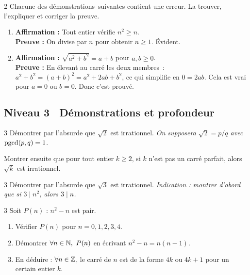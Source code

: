 \begin{exo}{2}
Chacune des \og d\'emonstrations\fg\ suivantes contient une erreur.
La trouver, l'expliquer et corriger la preuve.
\begin{enumerate}
  \item \textbf{Affirmation :} Tout entier v\'erifie $n^2 \geq n$.\\
        \textbf{Preuve :} On divise par $n$ pour obtenir $n \geq 1$. \'Evident.
  \item \textbf{Affirmation :} $\sqrt{a^2+b^2} = a + b$ pour $a,b \geq 0$.\\
        \textbf{Preuve :} En \'elevant au carr\'e les deux membres~:
        $a^2+b^2 = (a+b)^2 = a^2+2ab+b^2$, ce qui simplifie en $0=2ab$.
        Cela est vrai pour $a=0$ ou $b=0$. Donc c'est prouv\'e.
\end{enumerate}
\end{exo}

\subsection*{\quad Niveau 3 \textemdash\ D\'emonstrations et profondeur}

\begin{exo}{3}
D\'emontrer par l'absurde que $\sqrt{2}$
est irrationnel.
\emph{On supposera $\sqrt{2} = p/q$ avec $\operatorname{pgcd}(p,q)=1$.}

Montrer ensuite que pour tout entier $k\geq 2$, si $k$ n'est pas un
carr\'e parfait, alors $\sqrt{k}$ est irrationnel.
\end{exo}

\begin{exo}{3}
D\'emontrer par l'absurde que $\sqrt{3}$ est irrationnel.
\emph{Indication : montrer d'abord que si $3 \mid n^2$, alors $3 \mid n$.}
\end{exo}

\begin{exo}{3}
Soit $P(n)$ : \og $n^2 - n$ est pair.\fg
\begin{enumerate}
  \item V\'erifier $P(n)$ pour $n = 0, 1, 2, 3, 4$.
  \item D\'emontrer $\forall n \in \N,\ P(n)$ en \'ecrivant $n^2-n = n(n-1)$.
  \item En d\'eduire : $\forall n \in \mathbb{Z}$, le carr\'e de $n$ est de la forme
        $4k$ ou $4k+1$ pour un certain entier $k$.
\end{enumerate}
\end{exo}

